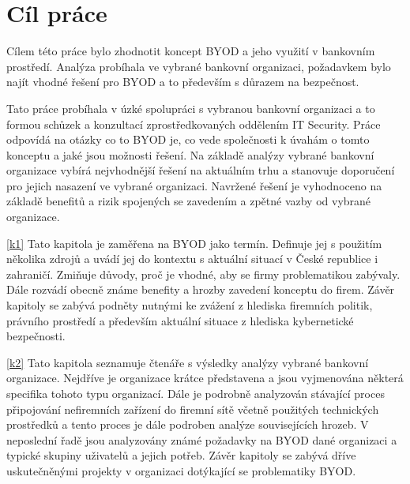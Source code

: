 \section{Cíl práce}
Cílem této práce bylo zhodnotit koncept BYOD a jeho využití v bankovním prostředí. Analýza probíhala ve vybrané bankovní organizaci, požadavkem bylo najít vhodné řešení pro BYOD a to především s důrazem na bezpečnost.

Tato práce probíhala v úzké spolupráci s vybranou bankovní organizaci a to formou schůzek a konzultací zprostředkovaných oddělením IT Security. Práce odpovídá na otázky co to BYOD je, co vede společnosti k úvahám o tomto konceptu a jaké jsou možnosti řešení.  Na základě analýzy vybrané bankovní organizace vybírá nejvhodnější řešení na aktuálním trhu a stanovuje doporučení pro jejich nasazení ve vybrané organizaci. Navržené řešení je vyhodnoceno na základě benefitů a rizik spojených se zavedením a zpětné vazby od vybrané organizace.

\ref{k1}
Tato kapitola je zaměřena na BYOD jako termín. Definuje jej s použitím několika zdrojů a uvádí jej do kontextu s aktuální situací v České republice i zahraničí. Zmiňuje důvody, proč je vhodné, aby se firmy problematikou zabývaly. Dále rozvádí obecně známe benefity a hrozby zavedení konceptu do firem. Závěr kapitoly se zabývá podněty nutnými ke zvážení z hlediska firemních politik, právního prostředí a především aktuální situace z hlediska kybernetické bezpečnosti.  

\ref{k2}
Tato kapitola seznamuje čtenáře s výsledky analýzy vybrané bankovní organizace. Nejdříve je organizace krátce představena a jsou vyjmenována některá specifika tohoto typu organizací. Dále je podrobně analyzován stávající proces připojování nefiremních zařízení do firemní sítě včetně použitých technických prostředků a tento proces je dále podroben analýze souvisejících hrozeb. V neposlední řadě jsou analyzovány známé požadavky na BYOD dané organizaci a typické skupiny uživatelů a jejich potřeb. Závěr kapitoly se zabývá dříve uskutečněnými projekty v organizaci dotýkající se problematiky BYOD.

